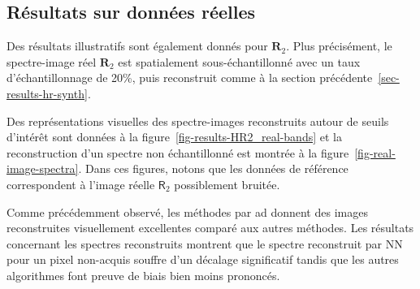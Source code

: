\subsection{Résultats sur données réelles}

Des résultats illustratifs sont également donnés pour $\mathbf{R}_2$. Plus précisément, le spectre-image réel $\mathbf{R}_2$ est spatialement sous-échantillonné avec un taux d'échantillonnage de 20\%, puis reconstruit comme à la section précédente~\ref{sec-results-hr-synth}.

Des représentations visuelles des spectre-images reconstruits autour de seuils d'intérêt sont données à la figure~\ref{fig-results-HR2_real-bands} et la reconstruction d'un spectre non échantillonné est montrée à la figure~\ref{fig-real-image-spectra}. Dans ces figures, notons que les données de référence correspondent à l'image réelle $\mathsf{R}_2$ possiblement bruitée.

Comme précédemment observé, les méthodes par \gls{ad} donnent des images reconstruites visuellement excellentes comparé aux autres méthodes. Les résultats concernant les spectres reconstruits montrent que le spectre reconstruit par NN pour un pixel non-acquis souffre d'un décalage significatif tandis que les autres algorithmes font preuve de biais bien moins prononcés. 


\begin{normalfigure*}[]
    \centering
    
    \caption{Résultats de reconstruction pour $\mathbf{R}_2$. Les images montrent la somme de 5 bandes autour de trois seuils particuliers ($\mathrm{O-K}$, $\mathrm{La-M}_{4, 5}$ et $\mathrm{Nd-M}_{4, 5}$). 
    Ces résultats confirment l'écart de performances entre NN dont les images ne sont pas assez lisses et les méthodes par \gls{ad} qui sont proches de la référence avec un effet additionnel de débruitage. Les résultats de CLS sont clairement meilleurs que NN et 3S et sont proches des résultats pour les méthodes par \gls{ad}. 
        \protect\label{fig-results-HR2_real-bands}}
\end{normalfigure*}


